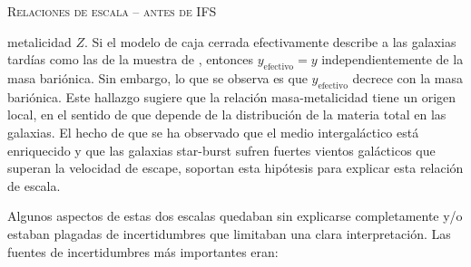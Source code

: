 \documentclass[xcolor=dvipsnames,4pt,hyperref={colorlinks,citecolor=black,linkcolor=black,urlcolor=black}]{beamer}
\begin{document}
\begin{frame}[allowframebreaks]{\textsc{Relaciones de escala -- antes de IFS}}
\begin{description}
metalicidad $Z$. Si el modelo de caja cerrada efectivamente describe a las galaxias tardías como las
de la muestra de \citeauthor{Tremonti2004}, entonces $y_\text{efectivo}=y$ independientemente de la
masa bariónica. Sin embargo, lo que se observa es que $y_\text{efectivo}$ decrece con la masa
bariónica. Este hallazgo sugiere que la relación masa-metalicidad tiene un origen local, en el
sentido de que depende de la distribución de la materia total en las galaxias. El hecho de que se ha
observado que el medio intergaláctico está enriquecido y que las galaxias star-burst sufren fuertes
vientos galácticos que superan la velocidad de escape, soportan esta hipótesis para explicar esta
relación de escala.
%
\end{description}

Algunos aspectos de estas dos escalas quedaban sin explicarse completamente y/o estaban plagadas de
incertidumbres que limitaban una clara interpretación. Las fuentes de incertidumbres más importantes
eran:


\end{frame}
\end{document}
